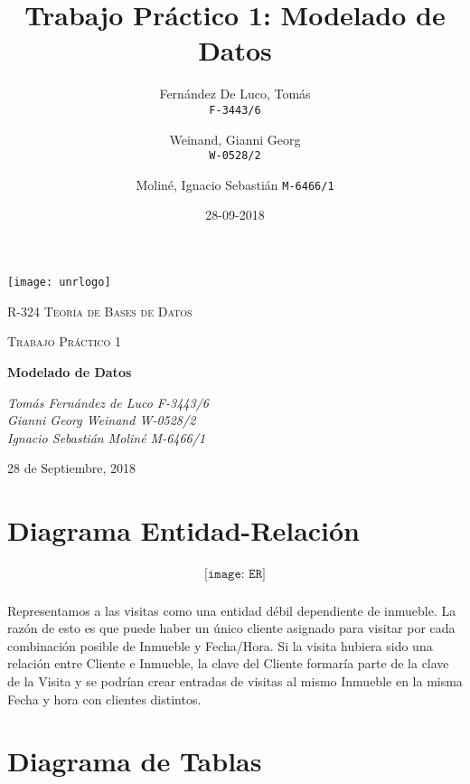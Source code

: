 \documentclass{article}
\title{Trabajo Pr\'actico 1: Modelado de Datos}
\date{28-09-2018}
\author{
	Fern\'andez De Luco, Tom\'as\\
	\texttt{F-3443/6}
	\and
	Weinand, Gianni Georg\\
	\texttt{W-0528/2}
	\and
	Molin\'e, Ignacio Sebasti\'an
	\texttt{M-6466/1}
}
\begin{document}
\begin{titlepage}
	\centering
	\texttt{[image: unrlogo]}\par\vspace{1cm}
	{\scshape\LARGE R-324 Teor\'ia de Bases de Datos \par}
	\vspace{1cm}
	{\scshape\Large Trabajo Pr\'actico 1\par}
	\vspace{1.5cm}
	{\huge\bfseries Modelado de Datos \par}
	\vspace{2cm}
	{\Large\itshape Tom\'as Fern\'andez de Luco F-3443/6 \\ Gianni Georg Weinand W-0528/2 \\ Ignacio Sebasti\'an Molin\'e M-6466/1 \par}

	\vfill

	{\large 28 de Septiembre, 2018 \par}
\end{titlepage}

\begin{comment}
\tableofcontents

\newpage
\end{comment}

\section{Diagrama Entidad-Relaci\'on}

\begin{align*}
\texttt{[image: ER]}
\end{align*}

\paragraph{}
Representamos a las visitas como una entidad d\'ebil dependiente de inmueble. La raz\'on de esto es que puede haber un \'unico cliente asignado para visitar por cada combinaci\'on posible de Inmueble y Fecha/Hora. Si la visita hubiera sido una relaci\'on entre Cliente e Inmueble, la clave del Cliente formar\'ia parte de la clave de la Visita y se podr\'ian crear entradas de visitas al mismo Inmueble en la misma Fecha y hora con clientes distintos.

\newpage

\section{Diagrama de Tablas}
\end{document}
